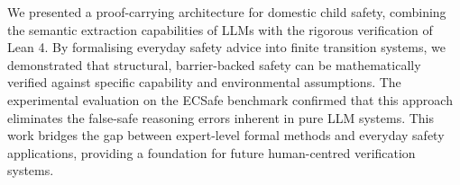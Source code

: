 We presented a proof-carrying architecture for domestic child safety, combining the semantic extraction capabilities of LLMs with the rigorous verification of Lean 4. By formalising everyday safety advice into finite transition systems, we demonstrated that structural, barrier-backed safety can be mathematically verified against specific capability and environmental assumptions. The experimental evaluation on the ECSafe benchmark confirmed that this approach eliminates the false-safe reasoning errors inherent in pure LLM systems. This work bridges the gap between expert-level formal methods and everyday safety applications, providing a foundation for future human-centred verification systems.
